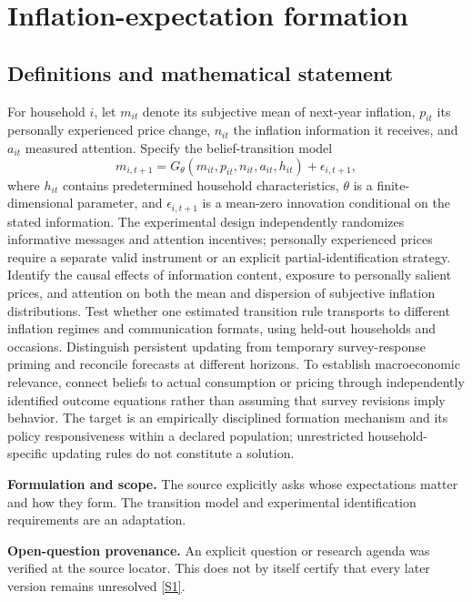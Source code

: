 \documentclass[11pt]{article}
\newcommand{\sref}[2]{\hyperlink{source:#1:#2}{[S#2]}}
\begin{document}
\section*{Inflation-expectation formation}\label{30007524}
\subsection{Definitions and mathematical statement}
For household \(i\), let \(m_{it}\) denote its subjective mean of next-year inflation, \(p_{it}\) its personally experienced price change, \(n_{it}\) the inflation information it receives, and \(a_{it}\) measured attention. Specify the belief-transition model
\[
m_{i,t+1}=G_\theta(m_{it},p_{it},n_{it},a_{it},h_{it})+\epsilon_{i,t+1},
\]
where \(h_{it}\) contains predetermined household characteristics, \(\theta\) is a finite-dimensional parameter, and \(\epsilon_{i,t+1}\) is a mean-zero innovation conditional on the stated information. The experimental design independently randomizes informative messages and attention incentives; personally experienced prices require a separate valid instrument or an explicit partial-identification strategy.
Identify the causal effects of information content, exposure to personally salient prices, and attention on both the mean and dispersion of subjective inflation distributions. Test whether one estimated transition rule transports to different inflation regimes and communication formats, using held-out households and occasions. Distinguish persistent updating from temporary survey-response priming and reconcile forecasts at different horizons. To establish macroeconomic relevance, connect beliefs to actual consumption or pricing through independently identified outcome equations rather than assuming that survey revisions imply behavior. The target is an empirically disciplined formation mechanism and its policy responsiveness within a declared population; unrestricted household-specific updating rules do not constitute a solution.

\par\textbf{Formulation and scope.} The source explicitly asks whose expectations matter and how they form. The transition model and experimental identification requirements are an adaptation.

\par\textbf{Open-question provenance.} An explicit question or research agenda was verified at the source locator. This does not by itself certify that every later version remains unresolved \sref{30007524}{1}.
\end{document}
